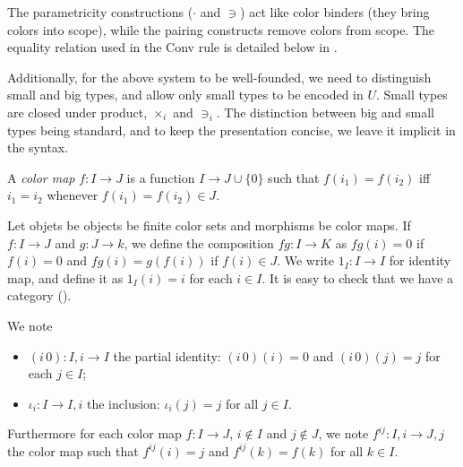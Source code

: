 \documentclass[english]{PaperTools/latex/lipics}
\def\pI{\ensuremath{\mathbf{pI}}}
\begin{document}
The parametricity constructions ($·$ and $∋$) act like color
binders (they bring colors into scope), while the pairing constructs
remove colors from scope.
The equality relation used in the {\sc Conv} rule is detailed below in .

Additionally, for the above system to be well-founded, we need to
distinguish small and big types, and allow only small types to be
encoded in $U$. Small types are closed under product, $×_i$ and
$∋_i$. The distinction between big and small types being standard, and
to keep the presentation concise, we leave it implicit in the syntax.

\begin{definition}
  A \emph{color map} $f : I → J$ is a function $I → J ∪ \{0\}$ such that
  $f(i_1) = f(i_2)$ iff $i_1 = i_2$ whenever $f(i_1) = f(i_2) ∈ J$.
%
%
\end{definition}

\begin{definition}[Category $\pI{}$]
  \label{def:pI}
  Let objets be objects be finite color sets
  and morphisms be color maps.
  If $f : I → J$ and $g : J → k$, we define the composition $fg : I → K$
  as $fg(i) = 0$ if $f(i) = 0$ and $fg(i) = g(f(i))$ if $f(i) ∈ J$.
  We write $1_I : I → I$ for identity map, and define it as $1_I(i) = i$ for each $i ∈ I$.
  It is easy to check that we have a category (\cite[ex.~9.7 p.~176]{PittsAM:nomsns}).
\end{definition}

We note
\begin{itemize}
\item $(i\,0) : I,i → I$ the partial identity: $(i\,0)(i) = 0$ and $(i\,0)(j) = j$ for each $j ∈ I$; 
\item $ι_i : I → I,i$ the inclusion: $ι_i(j) = j$ for all $j ∈ I$.
\end{itemize}
Furthermore for each color map $f : I → J$, $i ∉ I$ and $j ∉ J$, we
note $f^{ij} : I,i → J,j$ the color map such that
$f^{ij}(i) = j$ and $f^{ij}(k) = f(k)$ for all $k ∈ I$.
\end{document}
